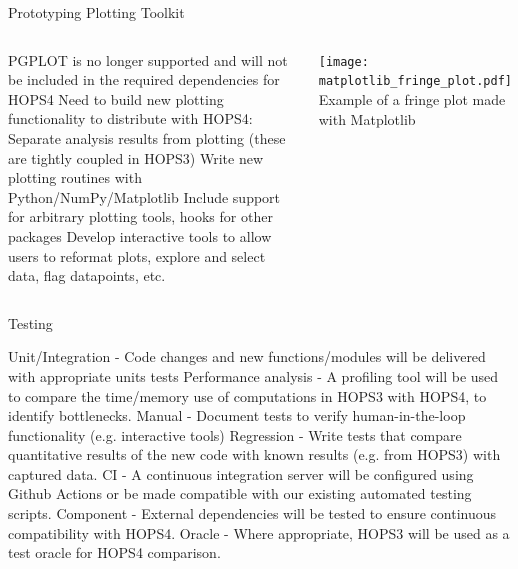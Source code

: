 \documentclass[8pt]{beamer}
\begin{document}


\begin{frame}{Prototyping Plotting Toolkit}
\begin{columns}
\begin{outline}
    \1 PGPLOT is no longer supported and will not be included in the required dependencies for HOPS4
    \1 Need to build new plotting functionality to distribute with HOPS4:
    \2 Separate analysis results from plotting (these are tightly coupled in HOPS3)
    \2 Write new plotting routines with Python/NumPy/Matplotlib
    \2 Include support for arbitrary plotting tools, hooks for other packages
    \2 Develop interactive tools to allow users to reformat plots, explore and select data, flag datapoints, etc.
\end{outline}
\centering
\texttt{[image: matplotlib\_fringe\_plot.pdf]}
Example of a fringe plot made with Matplotlib
\end{columns}
\end{frame}



\begin{frame}{Testing}




    \begin{outline}
        \1 Unit/Integration - Code changes and new functions/modules will be delivered with appropriate units tests
        \1 Performance analysis - A profiling tool will be used to compare the time/memory use of computations in HOPS3 with HOPS4, to identify bottlenecks.
        \1 Manual - Document tests to verify human-in-the-loop functionality (e.g. interactive tools)
        \1 Regression - Write tests that compare quantitative results of the new code with known results (e.g. from HOPS3) with captured data.
        \1 CI - A continuous integration server will be configured using Github Actions or be made compatible with our existing automated testing scripts.
        \1 Component - External dependencies will be tested to ensure continuous compatibility with HOPS4.
        \1 Oracle - Where appropriate, HOPS3 will be used as a test oracle for HOPS4 comparison.
    \end{outline}
    
\end{frame}
\end{document}
